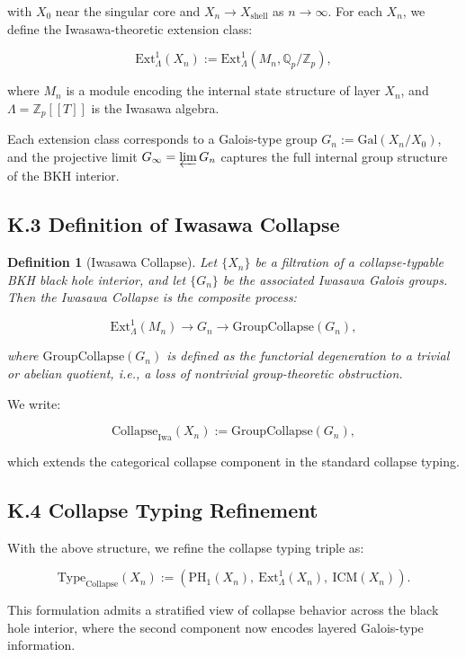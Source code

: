\documentclass[11pt]{article}
\newtheorem{definition}[theorem]{Definition}
\begin{document}
with \( X_0 \) near the singular core and \( X_n \to X_{\text{shell}} \) as \( n \to \infty \). For each \( X_n \), we define the Iwasawa-theoretic extension class:

\[
\mathrm{Ext}^1_{\Lambda}(X_n) := \mathrm{Ext}^1_{\Lambda}(M_n, \mathbb{Q}_p/\mathbb{Z}_p),
\]

where \( M_n \) is a module encoding the internal state structure of layer \( X_n \), and \( \Lambda = \mathbb{Z}_p[[T]] \) is the Iwasawa algebra.

Each extension class corresponds to a Galois-type group \( G_n := \mathrm{Gal}(X_n/X_0) \), and the projective limit \( G_{\infty} = \varprojlim G_n \) captures the full internal group structure of the BKH interior.

\subsection*{K.3 Definition of Iwasawa Collapse}

\begin{definition}[Iwasawa Collapse]
Let \( \{X_n\} \) be a filtration of a collapse-typable BKH black hole interior, and let \( \{G_n\} \) be the associated Iwasawa Galois groups. Then the Iwasawa Collapse is the composite process:

\[
\mathrm{Ext}^1_{\Lambda}(M_n) \longrightarrow G_n \longrightarrow \mathrm{GroupCollapse}(G_n),
\]

where \( \mathrm{GroupCollapse}(G_n) \) is defined as the functorial degeneration to a trivial or abelian quotient, i.e., a loss of nontrivial group-theoretic obstruction.
\end{definition}

We write:

\[
\mathrm{Collapse}_{\mathrm{Iwa}}(X_n) := \mathrm{GroupCollapse}(G_n),
\]

which extends the categorical collapse component in the standard collapse typing.

\subsection*{K.4 Collapse Typing Refinement}

With the above structure, we refine the collapse typing triple as:

\[
\mathrm{Type}_{\mathrm{Collapse}}(X_n) :=
\left(
\mathrm{PH}_1(X_n),\
\mathrm{Ext}^1_{\Lambda}(X_n),\
\mathrm{ICM}(X_n)
\right).
\]

This formulation admits a stratified view of collapse behavior across the black hole interior, where the second component now encodes layered Galois-type information.
\end{document}
